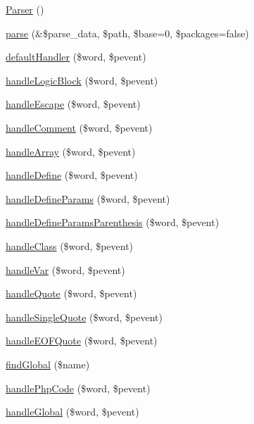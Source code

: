 \begin{DoxyCompactItemize}
\item 
\hyperlink{class_parser_a6bfb42ee628e026bebda9adb7ae8b895}{\-Parser} ()
\item 
\hyperlink{class_parser_a20139dbf0050f44b70e34bf32d89d7e4}{parse} (\&\$parse\-\_\-data, \$path, \$base=0, \$packages=false)
\item 
\hyperlink{class_parser_a4d5d6de1bd28d678fdca6e4d5e0076b0}{default\-Handler} (\$word, \$pevent)
\item 
\hyperlink{class_parser_a74750f3abb8dc11a29a566b51c414370}{handle\-Logic\-Block} (\$word, \$pevent)
\item 
\hyperlink{class_parser_a1c2833854f29529aca0a7deb1aad9b40}{handle\-Escape} (\$word, \$pevent)
\item 
\hyperlink{class_parser_a20f0c871394d25d98cb94346b92b52ad}{handle\-Comment} (\$word, \$pevent)
\item 
\hyperlink{class_parser_a87e25a238d2f075d47a558c3ae2da16e}{handle\-Array} (\$word, \$pevent)
\item 
\hyperlink{class_parser_a1769290b6b18b684616582c0db6bd0dd}{handle\-Define} (\$word, \$pevent)
\item 
\hyperlink{class_parser_accf0d45bf57d1bb5716638ed6c3ad4b0}{handle\-Define\-Params} (\$word, \$pevent)
\item 
\hyperlink{class_parser_a9a9bd626fd0ac06e0851f2411449270a}{handle\-Define\-Params\-Parenthesis} (\$word, \$pevent)
\item 
\hyperlink{class_parser_a3a3555968696bdaf66a627ebedc5e4aa}{handle\-Class} (\$word, \$pevent)
\item 
\hyperlink{class_parser_a5e19ceeed570fa556cfa546f730a093d}{handle\-Var} (\$word, \$pevent)
\item 
\hyperlink{class_parser_a4ba20cc549548714f50dafced3b6ec71}{handle\-Quote} (\$word, \$pevent)
\item 
\hyperlink{class_parser_a5405b77c3d3320ddebbc19f12fb3e685}{handle\-Single\-Quote} (\$word, \$pevent)
\item 
\hyperlink{class_parser_af6a2d9ac00bfc718ea5c03a4001cd4f4}{handle\-E\-O\-F\-Quote} (\$word, \$pevent)
\item 
\hyperlink{class_parser_a5eca2ddca775674cafde6847674f3bdb}{find\-Global} (\$name)
\item 
\hyperlink{class_parser_a08a1dde387562480e8030e16e8472548}{handle\-Php\-Code} (\$word, \$pevent)
\item 
\hyperlink{class_parser_a14ba3a6a3b54d131fa2769a616736213}{handle\-Global} (\$word, \$pevent)

\end{DoxyCompactItemize}
